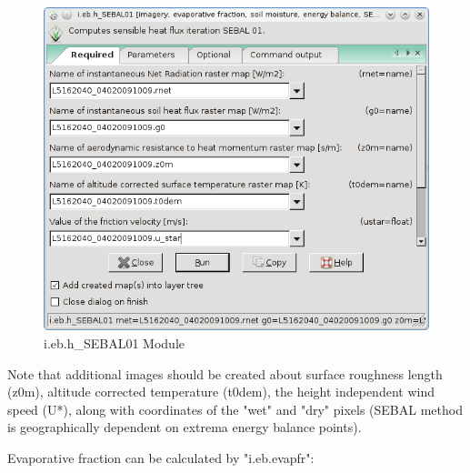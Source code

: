 \begin{figure}[htbp]
   \centering
   \includegraphics[scale=0.4]{gipe022.png}
   \caption{i.eb.h\_SEBAL01 Module}
   \label{fig:gipe022}
\end{figure}

Note that additional images should be created about surface roughness length (z0m), altitude corrected temperature (t0dem), the height independent wind speed (U*), along with coordinates of the "wet" and "dry" pixels (SEBAL method is geographically dependent on extrema energy balance points). \newline

Evaporative fraction can be calculated by "i.eb.evapfr":\newline

